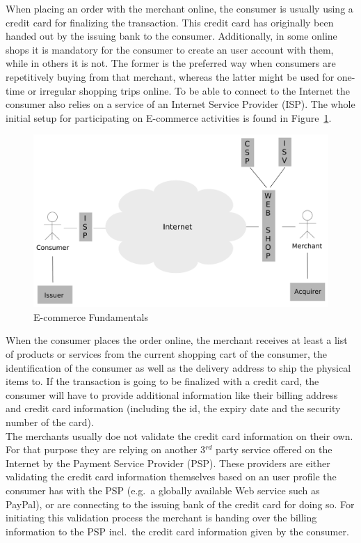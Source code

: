 When placing an order with the merchant online, the consumer is usually using a credit card for finalizing the transaction. This credit card has originally been handed out by the issuing bank to the consumer. Additionally, in some online shops it is mandatory for the consumer to create an user account with them, while in others it is not. The former is the preferred way when consumers are repetitively buying from that merchant, whereas the latter might be used for one-time or irregular shopping trips online. To be able to connect to the Internet the consumer also relies on a service of an Internet Service Provider (\gls{ISP}). The whole initial setup for participating on E-commerce activities is found in Figure~\ref{fig:images_ecommerce_scenario}.\@

\begin{figure}[H]
	\centering
		\includegraphics[width=0.8\columnwidth]{images/e-commerce-scenario.pdf}
	\caption{E-commerce Fundamentals}
\label{fig:images_ecommerce_scenario}
\end{figure}

When the consumer places the order online, the merchant receives at least a list of products or services from the current shopping cart of the consumer, the identification of the consumer as well as the delivery address to ship the physical items to. If the transaction is going to be finalized with a credit card, the consumer will have to provide additional information like their billing address and credit card information (including the id, the expiry date and the security number of the card). \\

The merchants usually doe not validate the credit card information on their own. For that purpose they are relying on another 3$^{rd}$ party service offered on the Internet by the Payment Service Provider (\gls{PSP}). These providers are either validating the credit card information themselves based on an user profile the consumer has with the \gls{PSP} (e.g.\ a globally available Web service such as PayPal), or are connecting to the issuing bank of the credit card for doing so. For initiating this validation process the merchant is handing over the billing information to the \gls{PSP} incl.\ the credit card information given by the consumer. \\


